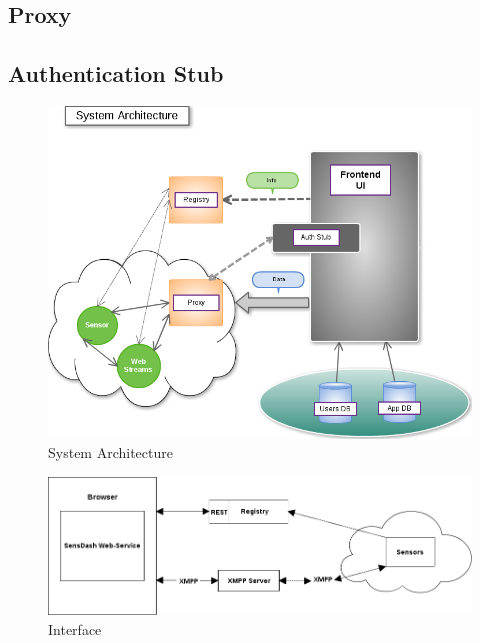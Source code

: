 	\subsection{Proxy}
	\subsection{Authentication Stub}

\begin{figure}[!ht]
\centering
\includegraphics[scale=0.5]{images/Structure.png}   
\caption[System Architecture]{System Architecture}
\label{img:structure}                           
\end{figure}


\begin{figure}[!ht]
\centering
\includegraphics[scale=0.5]{images/Interface.png}   
\caption[Interface]{Interface}
\label{img:interfaces}                           
\end{figure}

